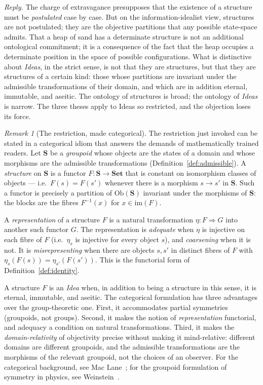\documentclass[11pt,a4paper]{article}
\theoremstyle{definition}
\theoremstyle{remark}
\newtheorem{remark}{Remark}[section]
\begin{document}
\noindent
\emph{Reply.} The charge of extravagance presupposes that the
existence of a structure must be \emph{postulated} case by case. But
on the information-idealist view, structures are not postulated; they
are the objective partitions that any possible state-space admits.
That a heap of sand has a determinate structure is not an additional
ontological commitment; it is a consequence of the fact that the heap
occupies a determinate position in the space of possible
configurations. What is distinctive about \emph{Ideas}, in the strict
sense, is not that they are structures, but that they are structures
of a certain kind: those whose partitions are invariant under the
admissible transformations of their domain, and which are in addition
eternal, immutable, and aseitic. The ontology of structures is broad;
the ontology of \emph{Ideas} is narrow. The three theses apply to
Ideas so restricted, and the objection loses its force.

\begin{remark}[The restriction, made categorical]
\label{rem:categorical}
The restriction just invoked can be stated in a categorical idiom that
answers the demands of mathematically trained readers. Let
$\mathbf{S}$ be a \emph{groupoid} whose objects are the states of a
domain and whose morphisms are the admissible transformations
(Definition~\ref{def:admissible}). A \emph{structure} on
$\mathbf{S}$ is a functor $F : \mathbf{S} \to \mathbf{Set}$ that is
constant on isomorphism classes of objects --- i.e.\ $F(s) = F(s')$
whenever there is a morphism $s \to s'$ in $\mathbf{S}$. Such a
functor is precisely a partition of $\mathrm{Ob}(\mathbf{S})$
invariant under the morphisms of $\mathbf{S}$: the blocks are the
fibres $F^{-1}(x)$ for $x \in \mathrm{im}(F)$.

A \emph{representation} of a structure $F$ is a natural transformation
$\eta : F \Rightarrow G$ into another such functor $G$. The
representation is \emph{adequate} when $\eta$ is injective on each
fibre of $F$ (i.e.\ $\eta_s$ is injective for every object $s$), and
\emph{coarsening} when it is not. It is \emph{misrepresenting} when
there are objects $s, s'$ in distinct fibres of $F$ with
$\eta_s(F(s)) = \eta_{s'}(F(s'))$. This is the functorial form of
Definition~\ref{def:identity}.

A structure $F$ is an \emph{Idea} when, in addition to being a
structure in this sense, it is eternal, immutable, and aseitic. The
categorical formulation has three advantages over the group-theoretic
one. First, it accommodates partial symmetries (groupoids, not
groups). Second, it makes the notion of \emph{representation}
functorial, and adequacy a condition on natural transformations.
Third, it makes the \emph{domain-relativity} of objectivity precise
without making it mind-relative: different domains are different
groupoids, and the admissible transformations are the morphisms of the
relevant groupoid, not the choices of an observer. For the categorical
background, see Mac Lane~\cite{MacLane1998}; for the groupoid
formulation of symmetry in physics, see
Weinstein~\cite{Weinstein1996}.
\end{remark}
\end{document}
